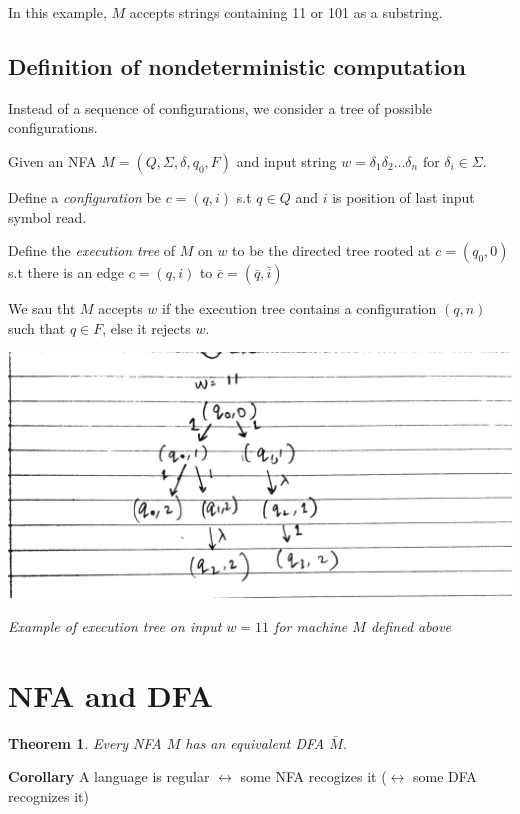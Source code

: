 \documentclass[oneside, 12pt]{book}
\newtheorem{theorem}{Theorem}
\begin{document}
In this example, $M$ accepts strings containing 11 or 101 as a substring.

\subsection{Definition of nondeterministic computation}

Instead of a sequence of configurations, we consider a tree of possible configurations.

Given an NFA $M = (Q,\Sigma,\delta, q_{0}, F)$ and input string $w = \delta_{1}\delta_{2}\dots \delta_{n} \text{ for } \delta_{i} \in \Sigma$.

Define a \emph{configuration} be $c=(q, i)$ s.t $q\in Q$ and $i$ is position of last input symbol read.

Define the \emph{execution tree} of $M$ on $w$ to be the directed tree rooted at $c = (q_{0}, 0)$ s.t there is an edge $c=(q, i)$ to $\bar{c}=(\bar{q},\bar{i})$

We sau tht $M$ accepts $w$ if the execution tree contains a configuration $(q,n)$ such that $q\in F$, else it rejects $w$.


\includegraphics[width=\textwidth]{tree}
\begin{center}
\emph{Example of execution tree on input $w=11$ for machine $M$ defined above}
\end{center}

\section{NFA and DFA}

\begin{theorem}

Every NFA $M$ has an equivalent DFA $\bar{M}$.
\end{theorem}

\textbf{Corollary} A language is regular $\leftrightarrow$ some NFA recogizes it
($\leftrightarrow$ some DFA recognizes it)
\end{document}
